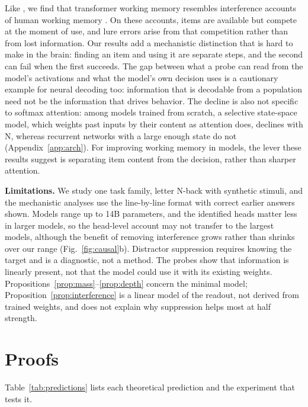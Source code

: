 \documentclass{article}
\begin{document}
Like \citet{xiong2026superposition}, we find that transformer working memory resembles interference accounts of human working memory \citep{oberauer2012interference,szmalec2011interference,engle2002executive}. On these accounts, items are available but compete at the moment of use, and lure errors arise from that competition rather than from lost information. Our results add a mechanistic distinction that is hard to make in the brain: finding an item and using it are separate steps, and the second can fail when the first succeeds. The gap between what a probe can read from the model's activations and what the model's own decision uses is a cautionary example for neural decoding too: information that is decodable from a population need not be the information that drives behavior. The decline is also not specific to softmax attention: among models trained from scratch, a selective state-space model, which weights past inputs by their content as attention does, declines with N, whereas recurrent networks with a large enough state do not (Appendix~\ref{app:arch}). For improving working memory in models, the lever these results suggest is separating item content from the decision, rather than sharper attention.

\textbf{Limitations.} We study one task family, letter N-back with synthetic stimuli, and the mechanistic analyses use the line-by-line format with correct earlier answers shown. Models range up to 14B parameters, and the identified heads matter less in larger models, so the head-level account may not transfer to the largest models, although the benefit of removing interference grows rather than shrinks over our range (Fig.~\ref{fig:causal}b). Distractor suppression requires knowing the target and is a diagnostic, not a method. The probes show that information is linearly present, not that the model could use it with its existing weights. Propositions~\ref{prop:mass}--\ref{prop:depth} concern the minimal model; Proposition~\ref{prop:interference} is a linear model of the readout, not derived from trained weights, and does not explain why suppression helps most at half strength.




\appendix

\section{Proofs}
\label{app:theory}

Table~\ref{tab:predictions} lists each theoretical prediction and the experiment that tests it.
\end{document}
